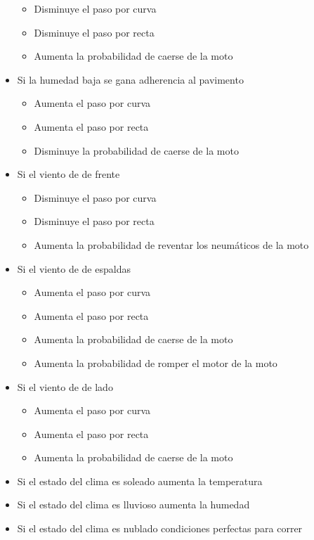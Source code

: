 \begin{itemize}
\begin{itemize}
			\item Disminuye el paso por curva
			\item Disminuye el paso por recta
			\item Aumenta la probabilidad de caerse de la moto
		\end{itemize}
		\item Si la humedad baja se gana adherencia al pavimento
		\begin{itemize}
			\item Aumenta el paso por curva
			\item Aumenta el paso por recta
			\item Disminuye la probabilidad de caerse de la moto
		\end{itemize}
	
		\item Si el viento de de frente
		\begin{itemize}
			\item Disminuye el paso por curva
			\item Disminuye el paso por recta
			\item Aumenta la probabilidad de reventar los neumáticos de la moto
		\end{itemize}
		\item Si el viento de de espaldas
		\begin{itemize}
			\item Aumenta el paso por curva
			\item Aumenta el paso por recta
			\item Aumenta la probabilidad de caerse de la moto
			\item Aumenta la probabilidad de romper el motor de la moto
		\end{itemize}
		\item Si el viento de de lado
		\begin{itemize}
			\item Aumenta el paso por curva
			\item Aumenta el paso por recta
			\item Aumenta la probabilidad de caerse de la moto
		\end{itemize}
	
		\item Si el estado del clima es soleado aumenta la temperatura
		\item Si el estado del clima es lluvioso aumenta la humedad
		\item Si el estado del clima es nublado condiciones perfectas para correr
		

\end{itemize}

